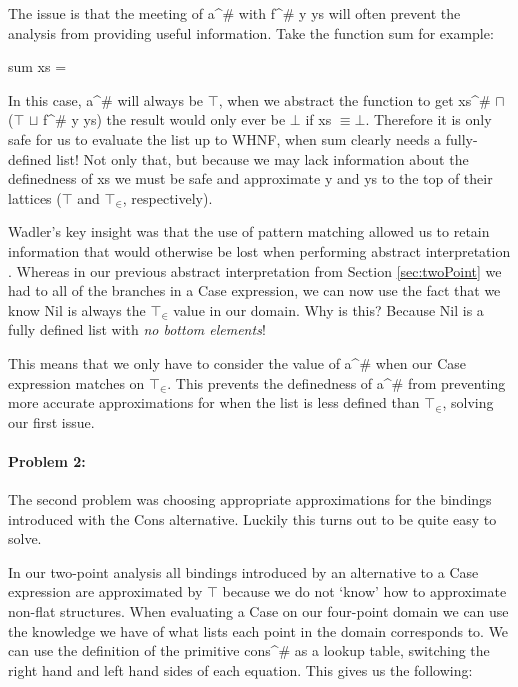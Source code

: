 The issue is that the \<meet\>ing of \<a^{\#}\> with \<f^{\#} y ys\> will often
prevent the analysis from providing useful information. Take the function
\<sum\> for example:

\begin{haskell*}
sum xs = 
\end{haskell*}

In this case, \<a^{\#}\> will always be $\top$, when we abstract the function
to get \<xs^{\#} \(\sqcap\) (\(\top\) \(\sqcup\) f^{\#} y ys)\> the result
would only ever be $\bot$ if \<xs \(\equiv \bot\)\>. Therefore it is only safe
for us to evaluate the list up to WHNF, when \<sum\> clearly needs a
fully-defined list! Not only that, but because we may lack information about
the definedness of \<xs\> we must be safe and approximate \<y\> and \<ys\> to
the top of their lattices ($\top$ and $\top_{\in}$, respectively). 

Wadler's key insight was that the use of pattern matching allowed us to retain
information that would otherwise be lost when performing abstract
interpretation \citep{wadler1987strictness}. Whereas in our previous abstract
interpretation from Section \ref{sec:twoPoint} we had to \join all of the
branches in a \<Case\> expression, we can now use the fact that we know \<Nil\>
is always the $\top_{\in}$ value in our domain.  Why is this?  Because \<Nil\>
is a fully defined list with \emph{no bottom elements}!

This means that we only have to consider the value of \<a^{\#}\> when our
\<Case\> expression matches on $\top_{\in}$. This prevents the definedness
of \<a^{\#}\> from preventing more accurate approximations for when the list is
less defined than $\top_{\in}$, solving our first issue.

\paragraph{Problem 2:} The second problem was choosing appropriate approximations
for the bindings introduced with the \<Cons\> alternative. Luckily this turns out
to be quite easy to solve.

In our two-point analysis all bindings introduced by an alternative to a
\<Case\> expression are approximated by $\top$ because we do not `know' how to
approximate non-flat structures. When evaluating a \<Case\> on our four-point
domain we can use the knowledge we have of what lists each point in the domain
corresponds to. We can use the definition of the primitive \<cons^{\#}\> as
a lookup table, switching the right hand and left hand sides of each equation.
This gives us the following:

